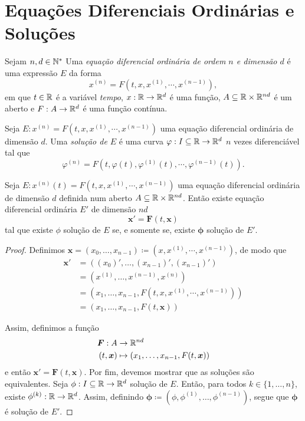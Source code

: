 \section{Equações Diferenciais Ordinárias e Soluções}

\begin{defi}
	Sejam $n,d \in \mathbb{N}^*$ Uma \emph{equação diferencial ordinária de ordem $n$ e dimensão $d$} é uma expressão $E$ da forma
	\begin{equation*}
	x^{(n)} = F(t, x, x^{(1)}, \cdots,x^{(n-1)}),
	\end{equation*}
em que $t \in \mathbb{R}$ é a variável \emph{tempo}, $x : \mathbb{R} \to \mathbb{R}^d$ é uma função, $A \subseteq \mathbb{R} \times \mathbb{R}^{nd}$ é um aberto e $F: A \to \mathbb{R}^d$ é uma função contínua.
\end{defi}

\begin{defi}
	Seja $E: x^{(n)} = F(t, x, x^{(1)}, \cdots,x^{(n-1)})$ uma equação diferencial ordinária de dimensão $d$. Uma \emph{solução de $E$} é uma curva $\varphi: I \subseteq \mathbb{R} \to \mathbb{R}^d$ $n$ vezes diferenciável tal que
	\begin{equation*}
	\varphi^{(n)} = F(t, \varphi(t), \varphi^{(1)}(t), \cdots,\varphi^{(n-1)}(t)).
	\end{equation*}
\end{defi}

\begin{prop}
	Seja $E: x^{(n)}(t) = F(t, x, x^{(1)}, \cdots,x^{(n-1)})$ uma equação diferencial ordinária de dimensão $d$ definida num aberto $A \subseteq \mathbb{R} \times \mathbb{R}^{nd}$. Então existe equação diferencial ordinária $E'$ de dimensão $nd$
	\begin{equation*}
	 \bm x' = \bm F(t,\bm x)
	\end{equation*}	
tal que existe $\phi$ solução de $E$ se, e somente se, existe $\bm \phi$ solução de $E'$.
\end{prop}
\begin{proof}
	Definimos $\bm x = (x_0, \ldots,x_{n-1}) \coloneqq (x,x^{(1)}, \cdots,x^{(n-1)})$, de modo que
	\begin{align*}
	\bm x' &= ((x_0)',\ldots,(x_{n-1})',(x_{n-1})') \\
			&= (x^{(1)}, \ldots,x^{(n-1)},x^{(n)}) \\
			&= (x_1,\ldots,x_{n-1},F(t, x, x^{(1)}, \cdots,x^{(n-1)})) \\
			&= (x_1,\ldots,x_{n-1},F(t,\bm x))
	\end{align*}	

	Assim, definimos a função
	\begin{align*}
	\bm F: A &\to \mathbb{R}^{nd} \\
	(t,\bm x) &\mapsto (x_1,\ldots,x_{n-1},F(t, \bm x))
	\end{align*}
e então $\bm x' = \bm F(t,\bm x)$. Por fim, devemos mostrar que as soluções são equivalentes. Seja $\phi: I \subseteq \mathbb{R} \to \mathbb{R}^d$ solução de $E$. Então, para todos $k \in \{1,\ldots,n\}$, existe $\phi^{(k)}: \mathbb{R} \to \mathbb{R}^d$. Assim, definindo $\bm \phi \coloneqq (\phi,\phi^{(1)},\ldots,\phi^{(n-1)})$, segue que $\bm \phi$ é solução de $E'$.
\end{proof}

